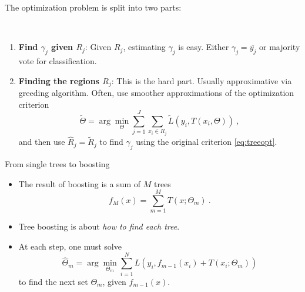 \documentclass[
  10pt,
  ignorenonframetext,
]{beamer}
\providecommand{\tightlist}{%
  \setlength{\itemsep}{0pt}\setlength{\parskip}{0pt}}
\begin{document}
\begin{frame}
\label{sl:regions}

The optimization problem is split into two parts:

\(~\)

\begin{enumerate}
[1)]
\tightlist
\item
  \textbf{Find \(\gamma_j\) given \(R_j\)}: Given \(R_j\), estimating
  \(\gamma_j\) is easy. Either \(\gamma_j=\overline{y_j}\) or majority
  vote for classification.
\end{enumerate}

\vspace{2mm}

\begin{enumerate}
[1)]
\setcounter{enumi}{1}
\tightlist
\item
  \textbf{Finding the regions \(R_j\)}: This is the hard part. Usually
  approximative via greeding algorithm. Often, use smoother
  approximations of the optimization criterion
  \begin{equation}\label{eq:approx}
  \tilde\Theta = \arg \min_\Theta \sum_{j=1}^J \sum_{x_i \in R_j} \tilde{L}(y_i,T(x_i,\Theta)) \ , 
  \end{equation} and then use \(\hat{R}_j=\tilde{R}_j\) to find
  \(\gamma_j\) using the original criterion \eqref{eq:treeopt}.
\end{enumerate}
\end{frame}

\begin{frame}
\begin{block}{From single trees to boosting}
\protect\hypertarget{from-single-trees-to-boosting}{}
\(~\)

\begin{itemize}
\item
  The result of boosting is a sum of \(M\) trees
  \[f_M(x) = \sum_{m=1}^M T(x;\Theta_m) \ .\] \vspace{2mm}
\item
  Tree boosting is about \emph{how to find each tree}.
\end{itemize}

\vspace{2mm}

\begin{itemize}
\tightlist
\item
  At each step, one must solve \begin{equation}\label{eq:boosted}
  \hat\Theta_m = \arg \min_{\Theta_m} \sum_{i=1}^N L\left(y_i, f_{m-1}(x_i) + T(x_i;\Theta_m)\right) 
  \end{equation} to find the next set \(\Theta_m\), given
  \(f_{m-1}(x)\).
\end{itemize}
\end{block}
\end{frame}
\end{document}
